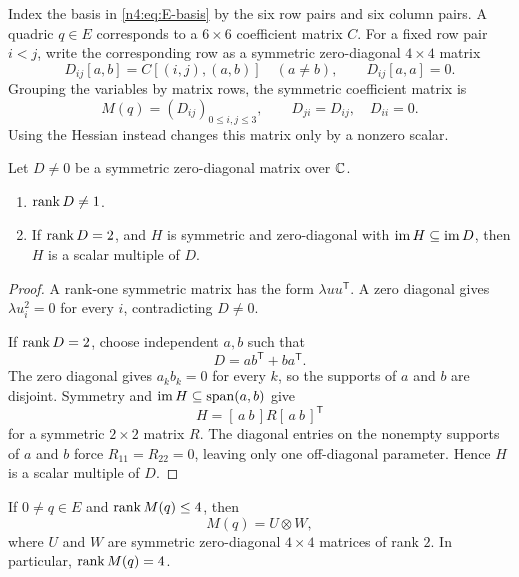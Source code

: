 Index the basis in \eqref{n4:eq:E-basis} by the six row pairs and six column
pairs. A quadric \(q\in E\) corresponds to a \(6\times6\) coefficient matrix
\(C\). For a fixed row pair \(i<j\), write the corresponding row as a
symmetric zero-diagonal \(4\times4\) matrix
\[
  D_{ij}[a,b]=C[(i,j),(a,b)]\quad(a\neq b),\qquad D_{ij}[a,a]=0.
\]
Grouping the variables by matrix rows, the symmetric coefficient matrix is
\begin{equation}\label{n4:eq:block-matrix}
  M(q)=(D_{ij})_{0\leq i,j\leq3},\qquad
  D_{ji}=D_{ij},\quad D_{ii}=0.
\end{equation}
Using the Hessian instead changes this matrix only by a nonzero scalar.

\begin{lemma}\label{n4:lem:zero-diagonal}
Let \(D\neq0\) be a symmetric zero-diagonal matrix over \(\mathbb C\).
\begin{enumerate}[label=(\roman*)]
  \item \(\operatorname{rank} D\neq1\).
  \item If \(\operatorname{rank} D=2\), and \(H\) is symmetric and zero-diagonal with
  \(\operatorname{im} H\subseteq\operatorname{im} D\), then \(H\) is a scalar multiple of \(D\).
\end{enumerate}
\end{lemma}

\begin{proof}
A rank-one symmetric matrix has the form \(\lambda uu^{\mathsf T}\). A zero
diagonal gives \(\lambda u_i^2=0\) for every \(i\), contradicting
\(D\neq0\).

If \(\operatorname{rank} D=2\), choose independent \(a,b\) such that
\[
  D=ab^{\mathsf T}+ba^{\mathsf T}.
\]
The zero diagonal gives \(a_kb_k=0\) for every \(k\), so the supports of
\(a\) and \(b\) are disjoint. Symmetry and
\(\operatorname{im} H\subseteq\operatorname{span}(a,b)\) give
\[
  H=[\,a\ b\,]R[\,a\ b\,]^{\mathsf T}
\]
for a symmetric \(2\times2\) matrix \(R\). The diagonal entries on the
nonempty supports of \(a\) and \(b\) force \(R_{11}=R_{22}=0\), leaving only
one off-diagonal parameter. Hence \(H\) is a scalar multiple of \(D\).
\end{proof}

\begin{theorem}\label{n4:thm:rank-four-classification}
If \(0\neq q\in E\) and \(\operatorname{rank} M(q)\leq4\), then
\[
  M(q)=U\otimes W,
\]
where \(U\) and \(W\) are symmetric zero-diagonal \(4\times4\) matrices of
rank \(2\). In particular, \(\operatorname{rank} M(q)=4\).
\end{theorem}

